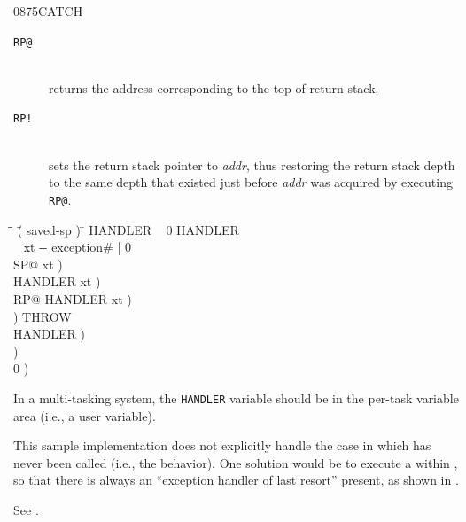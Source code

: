 \begin{worddef}{0875}{CATCH}
\begin{implement}
\begin{description}
		\item[\texttt{RP@}]  \\
			returns the address corresponding to the top of return stack.

		\item[\texttt{RP!}]  \\
			sets the return stack pointer to \emph{addr}, thus restoring the
			return stack depth to the same depth that existed just before
			\emph{addr} was acquired by executing \texttt{RP@}.
		\end{description}

		\ttfamily
		\begin{tabbing}
		\tab \= \tab \= \hspace{7em} \= ( saved-sp ) \= \kill
		 HANDLER ~ 0 HANDLER \word{!} ~   \\[\parskip]

		\+ \word{:}  ~  xt -{}- exception\# | 0    \\
			SP@ 					\>\>  xt )\>   \\
			HANDLER  		\>\>  xt )\>   \\
			RP@ HANDLER \word{!}			\>\>  xt )\>   \\
								\>\>  )	  \>   THROW \\
			 HANDLER \word{!}	\>\>  )   \>   \\
			 		\>\>  )   \>   \\
										\>\>  0 ) \>   \\
		\word{;}
		\end{tabbing}

		\dffamily
		In a multi-tasking system, the \texttt{HANDLER} variable should be in
		the per-task variable area (i.e., a user variable).

		This sample implementation does not explicitly handle the case in
		which  has never been called (i.e., the 
		behavior). One solution would be to execute a  within
		, so that there is always an ``exception handler of last
		resort'' present, as shown in .
	\end{implement}

	\begin{testing} %
		See .
	\end{testing}
\end{worddef}


